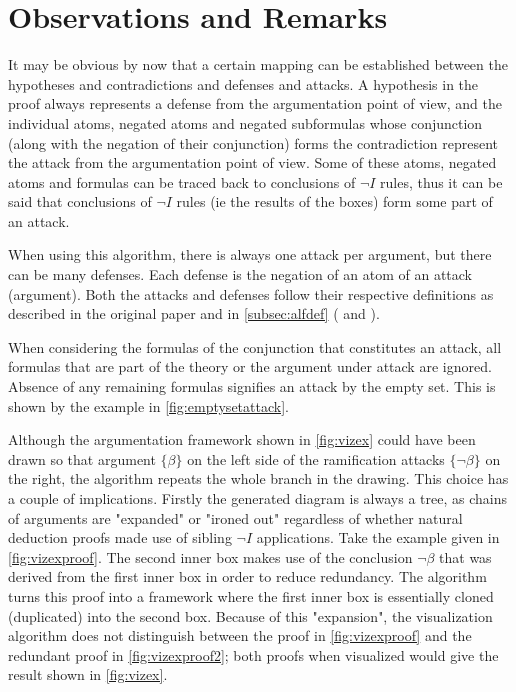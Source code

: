 \documentclass[11pt,twoside,a4paper]{report}
\begin{document}
\section{Observations and Remarks}
\label{sec:vizmarks}
It may be obvious by now that a certain mapping can be established between the hypotheses and contradictions and defenses and attacks. A hypothesis in the proof always represents a defense from the argumentation point of view, and the individual atoms, negated atoms and negated subformulas whose conjunction (along with the negation of their conjunction) forms the contradiction represent the attack from the argumentation point of view. Some of these atoms, negated atoms and formulas can be traced back to conclusions of $\neg I$ rules, thus it can be said that conclusions of $\neg I$ rules (ie the results of the boxes) form some part of an attack.

When using this algorithm, there is always one attack per argument, but there can be many defenses. Each defense is the negation of an atom of an attack (argument). Both the attacks and defenses follow their respective definitions as described in the original paper and in \autoref{subsec:alfdef} ( and ).

When considering the formulas of the conjunction that constitutes an attack, all formulas that are part of the theory or the argument under attack are ignored. Absence of any remaining formulas signifies an attack by the empty set. This is shown by the example in \autoref{fig:emptysetattack}.

Although the argumentation framework shown in \autoref{fig:vizex} could have been drawn so that argument $\{\beta\}$ on the left side of the ramification attacks $\{\neg\beta\}$ on the right, the algorithm repeats the whole branch in the drawing. This choice has a couple of implications. Firstly the generated diagram is always a tree, as chains of arguments are "expanded" or "ironed out" regardless of whether natural deduction proofs made use of sibling $\neg I$ applications. Take the example given in \autoref{fig:vizexproof}. The second inner box makes use of the conclusion $\neg\beta$ that was derived from the first inner box in order to reduce redundancy. The algorithm turns this proof into a framework where the first inner box is essentially cloned (duplicated) into the second box. Because of this "expansion", the visualization algorithm does not distinguish between the proof in \autoref{fig:vizexproof} and the redundant proof in \autoref{fig:vizexproof2}; both proofs when visualized would give the result shown in \autoref{fig:vizex}.
\end{document}
